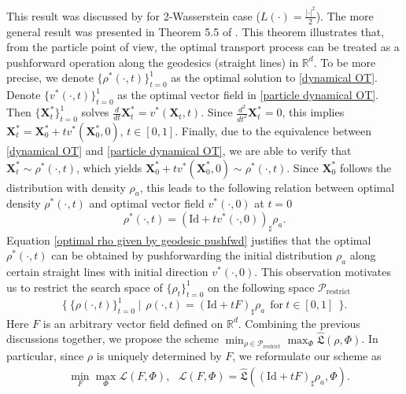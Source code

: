 \documentclass{article}
\begin{document}
This result was discussed by \citet{hjd2} for 2-Wasserstein case ($L(\cdot)=\frac{|\cdot|^2}{2}$). The more general result was presented in Theorem 5.5 of \cite{villani2003topics}. This theorem illustrates that, from the particle point of view, the optimal transport process can be treated as a pushforward operation along the geodesics (straight lines) in $\mathbb{R}^d$. To be more precise, we denote $\{\rho^*(\cdot, t)\}_{t=0}^1$ as the optimal solution to \eqref{dynamical OT}. Denote $\{{v}^*(\cdot, t)\}_{t=0}^1$ as the optimal vector field in \eqref{particle dynamical OT}. Then $\{\boldsymbol{X}_t^*\}_{t=0}^1$ solves $\frac{d}{dt}\boldsymbol{X}_t^* = {v}^*(\boldsymbol{X}_t,t)$. Since $\frac{d^2}{dt^2}\boldsymbol{X}_t^*=0$, this implies $\boldsymbol{X}^*_t = \boldsymbol{X}^*_0+t{v}^*(\boldsymbol{X}^*_0, 0)$, $t\in [0,1]$. Finally, due to the equivalence between \eqref{dynamical OT} and \eqref{particle dynamical OT}, we are able to verify that $\boldsymbol{X}^*_t\sim\rho^*(\cdot, t)$, which yields $\boldsymbol{X}^*_0+t{v}^*(\boldsymbol{X}^*_0, 0)\sim\rho^*(\cdot, t)$. Since $\boldsymbol{X}_0^*$ follows the distribution with density $\rho_a$, this leads to the following relation between optimal density $\rho^*(\cdot,t)$ and optimal vector field ${v}^*(\cdot, 0)$ at $t=0$
\begin{equation}
  \rho^*(\cdot, t) = (\textrm{Id}+t{v}^*(\cdot, 0))_{\sharp}\rho_a.  \label{optimal rho given by geodesic pushfwd}
\end{equation}
Equation \eqref{optimal rho given by geodesic pushfwd} justifies that the optimal $\rho^*(\cdot, t)$ can be obtained by pushforwarding the initial distribution $\rho_a$ along certain straight lines with initial direction ${v}^*(\cdot, 0)$. This observation motivates us to restrict the search space of $\{\rho_t\}_{t=0}^1$ on the following space $\mathcal{P}_{\textrm{restrict}}$
\begin{equation*}
  \{~\{\rho(\cdot, t)\}_{t=0}^1~|~ ~ \rho(\cdot, t) = (\textrm{Id}+t{F})_{\sharp}\rho_a~~\textrm{for}~  t \in[0,1]~~ \}.
\end{equation*}
Here ${F}$ is an arbitrary vector field defined on $\mathbb{R}^d$. Combining the previous discussions together, we propose the scheme $ \min_{\rho\in \mathcal{P}_{\textrm{restrict}}}\max_{\Phi} \hat{\mathfrak{L}}(\rho,\Phi)$. In particular, since $\rho$ is uniquely determined by ${F}$, we reformulate our scheme as
\begin{align}
  &  \min_{{F}}\max_{\Phi}  \mathcal{L}({F},\Phi),~~~ \mathcal{L}({F}, \Phi) = \hat{\mathfrak{L}}((\textrm{Id}+t{F})_{\sharp}\rho_a,\Phi).\label{chosen scheme}
\end{align}
\end{document}
